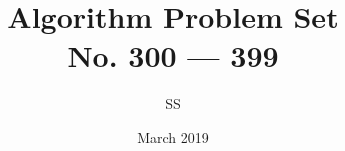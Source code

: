 \documentclass[a4paper,12pt]{article}
\title{Algorithm Problem Set \\ \large No. 300 --- 399}
\author{SS}
\date{March 2019}
\begin{document}
\renewcommand{\thelstlisting}{\thesection.\arabic{lstlisting}}
\maketitle

% 
% 
% 
% 
% 
% 
% 
% 
% 
% 
% 
% 
% 
% 
% 
% 
% 
% 
% 
% 
% 
% 
% 
% 
% 
% 
% 
% 
% 
% 
% 
% 
% 
% 
% 
% 
% 
% 
% 
% 
% 
% 
% 
% 
% 
% 
% 
% 
% 
% 
% 
% 
% 
% 
% 
% 
% 
% 
% 
% 
% 
% 
% 
% 
% 
% 
% 
% 
% 
% 
% 
% 
% 
% 
% 
% 
% 
% 
% 
% 
% 
% 
% 
% 















\end{document}

